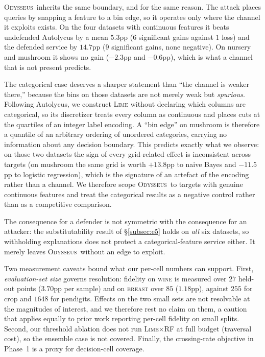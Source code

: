 \documentclass[sigconf,anonymous,review]{acmart}
\newcommand{\sys}{\textsc{Odysseus}}
\begin{document}
\sys\ inherits the same boundary, and for the same reason. The attack places queries by snapping a
feature to a bin edge, so it operates only where the channel it exploits exists. On the four datasets
with continuous features it beats undefended Autolycus by a mean $5.3$pp ($6$ significant gains
against $1$ loss) and the defended service by $14.7$pp ($9$ significant gains, none negative). On
nursery and mushroom it shows no gain ($-2.3$pp and $-0.6$pp), which is what a channel that is not
present predicts.

The categorical case deserves a sharper statement than ``the channel is weaker there,'' because the
bins on those datasets are not merely weak but \emph{spurious}. Following Autolycus, we construct
\textsc{Lime} without declaring which columns are categorical, so its discretizer treats every column
as continuous and places cuts at the quartiles of an integer label encoding. A ``bin edge'' on
mushroom is therefore a quantile of an arbitrary ordering of unordered categories, carrying no
information about any decision boundary. This predicts exactly what we observe: on those two datasets
the sign of every grid-related effect is inconsistent across targets (on mushroom the same grid is worth $+13.8$pp to naive Bayes and $-11.5$pp to logistic regression), which is the signature of an
artefact of the encoding rather than a channel. We therefore scope \sys\ to targets with genuine
continuous features and treat the categorical results as a negative control rather than as a
competitive comparison.

The consequence for a defender is not symmetric with the consequence for an attacker: the
substitutability result of \S\ref{subsec:e5} holds on \emph{all} six datasets, so withholding
explanations does not protect a categorical-feature service either. It merely leaves \sys\ without an
edge to exploit.

Two measurement caveats bound what our per-cell numbers can support. First, \emph{evaluation-set size}
governs resolution: fidelity on \textsc{wine} is measured over $27$ held-out points ($3.70$pp per
sample) and on \textsc{breast} over $85$ ($1.18$pp), against $255$ for crop and $1648$ for pendigits.
Effects on the two small sets are not resolvable at the magnitudes of interest, and we therefore rest no claim on them, a caution that applies equally to prior work reporting per-cell fidelity on small
splits. Second, our threshold ablation does not run \textsc{Lime}$\times$RF at full budget (traversal
cost), so the ensemble case is not covered. Finally, the crossing-rate objective in Phase~1 is a proxy
for decision-cell coverage.
\end{document}
